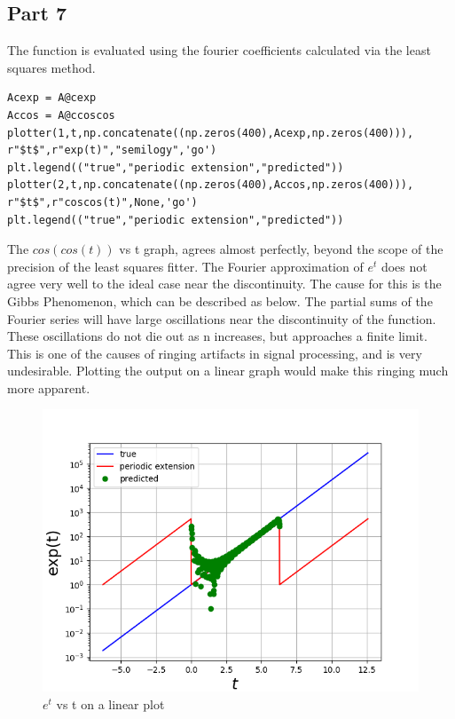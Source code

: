 \documentclass[11pt, a4paper]{article}
\begin{document}
\subsection{Part 7}
The function is evaluated using the fourier coefficients calculated via the least squares method.
\begin{verbatim}
Acexp = A@cexp
Accos = A@ccoscos
plotter(1,t,np.concatenate((np.zeros(400),Acexp,np.zeros(400))),
r"$t$",r"exp(t)","semilogy",'go')
plt.legend(("true","periodic extension","predicted"))
plotter(2,t,np.concatenate((np.zeros(400),Accos,np.zeros(400))),
r"$t$",r"coscos(t)",None,'go')
plt.legend(("true","periodic extension","predicted"))
\end{verbatim}
{The $cos(cos(t))$ vs t graph, agrees almost perfectly, beyond the scope of the precision of the least squares fitter.
The Fourier approximation of $e^{t}$ does not agree very well to the ideal case near the discontinuity. The cause for this is the Gibbs Phenomenon, which can be described as below.
The partial sums of the Fourier series will have large oscillations near the discontinuity of the function. These oscillations do not die out as n increases, but approaches a finite limit.
This is one of the causes of ringing artifacts in signal processing, and is very undesirable.
Plotting the output on a linear graph would make this ringing much more apparent.
}
\begin{figure}[!tbh]
   	\centering
   	\includegraphics[scale=0.5]{Figure_12.png}
   	\caption{$e^{t}$ vs t on a linear plot}

   	\label{fig:32}
   \end{figure}
\end{document}
